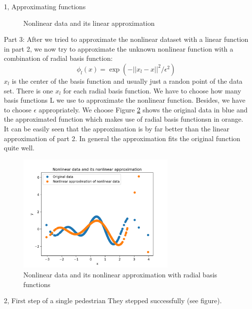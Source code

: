 \documentclass[10pt,a4paper]{article}
\begin{document}
\begin{task}{1, Approximating functions}
\begin{figure}[H]
\caption{Nonlinear data and its linear approximation}
\label{fig:task1_2}
\end{figure}
Part 3:
After we tried to approximate the nonlinear dataset with a linear function in part 2, we now try to approximate the unknown nonlinear function with a combination of radial basis function:
\begin{equation*}
	\phi_l(x) = \exp(-||x_l -x||^2/\epsilon^2)
\end{equation*}
$x_l$ is the center of the basis function and usually just a randon point of the data set. There is one $x_l$ for each radial basis function. We have to choose how many basis functions L  we use to approximate the nonlinear function. Besides, we have to choose $\epsilon$ appropriately.
We choose 
Figure \ref{fig:task1_3} shows the original data in blue and the approximated function which makes use of radial basis functionsn in orange. It can be easily seen that the approximation is by far better than the linear approximation of part 2. In general the approximation fits the original function quite well.
\begin{figure}[H]
\centering
\includegraphics[width=0.7\textwidth]{../plots/task1_part3.png}
\caption{Nonlinear data and its nonlinear approximation with radial basis functions}
\label{fig:task1_3}
\end{figure}
\end{task}
\begin{task}{2, First step of a single pedestrian}
They stepped successfully (see figure).
\end{task}
\end{document}

